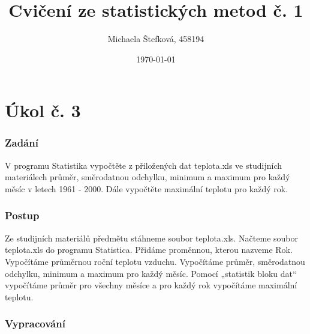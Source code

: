 \documentclass{article}
\title{Cvičení ze statistických metod č. 1} %
\author{Michaela Štefková, 458194} %
\date{\today} %
\begin{document}
	
	\maketitle %
	
	\part*{Úkol č. 3}
	\section*{Zadání} %
	
	V programu Statistika vypočtěte z přiložených dat teplota.xls ve studijních materiálech průměr, směrodatnou odchylku, minimum a maximum pro každý měsíc v letech 1961 - 2000. Dále vypočtěte maximální teplotu pro každý rok.
	
	
	\section*{Postup} %
	
	Ze studijních materiálů předmětu stáhneme soubor teplota.xls. Načteme soubor teplota.xls do programu Statistica. Přidáme proměnnou, kterou nazveme Rok. Vypočítáme průměrnou roční teplotu vzduchu. Vypočítáme průměr, směrodatnou odchylku, minimum a maximum pro každý měsíc. 
	Pomocí „statistik bloku dat“ vypočítáme průměr pro všechny měsíce a pro každý rok vypočítáme maximální teplotu.
	
	\section*{Vypracování}
	
\end{document}
